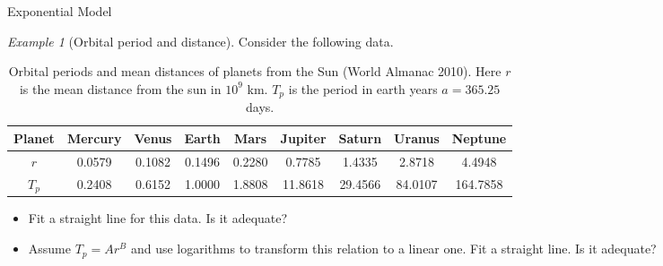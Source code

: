 \documentclass[xcolor=svgnames, t]{beamer}
\theoremstyle{definition}
\theoremstyle{plain}
\theoremstyle{remark}
\newtheorem{ex}{Example}
\begin{document}
\begin{frame}{Exponential Model}
	\begin{ex}[Orbital period and distance]
		Consider the following data.
\begin{table}[h]
	\centering
	\caption{Orbital periods and mean distances of planets from the Sun (World Almanac 2010). Here $ r $ is the mean distance from the sun in $ 10^9 $ km. $ T_p $ is the period in earth years $ a=365.25 $ days.}
	\label{tab:label}
	{\scriptsize
	\begin{tabular}{ccccccccc}
\hline
Planet & Mercury & Venus & Earth & Mars & Jupiter & Saturn & Uranus & Neptune \\
\hline
$r$ & 0.0579 & 0.1082 & 0.1496 & 0.2280 & 0.7785 & 1.4335 & 2.8718 & 4.4948 \\
\hline
$T_p$ & 0.2408 & 0.6152 & 1.0000 & 1.8808 & 11.8618 & 29.4566 & 84.0107 & 164.7858 \\
\hline
\end{tabular}}
\end{table}

\begin{itemize}
	\item Fit a straight line for this data. Is it adequate?
	\item Assume $ T_p = Ar^B $ and use logarithms to transform this relation to a linear one. Fit a straight line. Is it adequate? 
\end{itemize}
\end{ex}


\end{frame}
\end{document}
